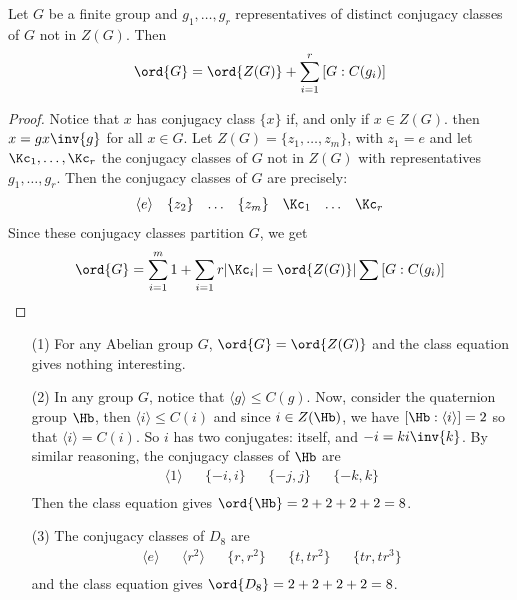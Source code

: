 \begin{theorem}\label{4.3.2}
    Let $G$ be a finite group and  $g_1, \dots, g_r$ representatives of distinct
    conjugacy classes of $G$ not in  $Z(G)$. Then
    \begin{equation*}
        \ord{G}=\ord{Z(G)}+\sum_{i=1}^r{[G:C(g_i)]}
    \end{equation*}
\end{theorem}
\begin{proof}
    Notice that $x$ has conjugacy class  $\{x\}$ if, and only if $x \in Z(G)$.
    then $x=gx\inv{g}$ for all $x \in G$. Let  $Z(G)=\{z_1, \dots, z_m\}$, with
    $z_1=e$ and let $\Kc_1, \dots, \Kc_r$ the conjugacy classes of $G$ not in
    $Z(G)$ with representatives $g_1, \dots, g_r$. Then the conjugacy classes of
    $G$ are precisely:
    \begin{align*}
        \langle e \rangle && \{z_2\} && \dots && \{z_m\} && \Kc_1 && \dots && \Kc_r   \\
    \end{align*}
    Since these conjugacy classes partition $G$, we get
    \begin{equation*}
        \ord{G}=\sum_{i=1}^m{1}+\sum_{i=1}{r}{|\Kc_i|}=\ord{Z(G)}|\sum{[G:C(g_i)]}
    \end{equation*}
\end{proof}

\begin{example}\label{}
    \begin{enumerate}
        \item[(1)] For any Abelian group $G$,  $\ord{G}=\ord{Z(G)}$ and the
            class equation gives nothing interesting.

        \item[(2)] In any group $G$, notice that  $\langle g \rangle \leq C(g)$.
            Now, consider the quaternion group $\Hb$, then
            $\langle i \rangle \leq C(i)$ and since $i \in Z(\Hb)$, we have
            $[\Hb:\langle i \rangle]=2$ so that $\langle i \rangle=C(i)$. So $i$
            has two conjugates: itself, and  $-i=ki\inv{k}$. By similar reasoning,
            the conjugacy classes of $\Hb$ are
            \begin{align*}
                \langle 1 \rangle && \{-i,i\} && \{-j,j\} && \{-k,k\}   \\
            \end{align*}
            Then the class equation gives $\ord{\Hb}=2+2+2+2=8$.

        \item[(3)] The conjugacy classes of $D_8$ are
            \begin{align*}
                \langle e \rangle && \langle r^2 \rangle &&\{r,r^2\} &&
                \{t,tr^2\} && \{tr,tr^3\}   \\
            \end{align*}
            and the class equation gives $\ord{D_8}=2+2+2+2=8$.
    \end{enumerate}
\end{example}

